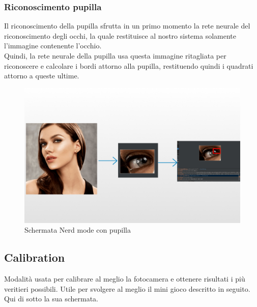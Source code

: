 \documentclass[11pt]{article}
\begin{document}
\subsubsection{Riconoscimento pupilla}
Il riconoscimento della pupilla sfrutta in un primo momento la rete neurale del riconoscimento degli occhi, la quale restituisce al nostro sistema solamente l'immagine contenente l'occhio.\\ Quindi, la rete neurale della pupilla usa questa immagine ritagliata per riconoscere e calcolare i bordi attorno alla pupilla, restituendo quindi i quadrati attorno a queste ultime.
\begin{figure}[h]
\caption{Schermata Nerd mode con pupilla }
\centering
\includegraphics[scale=0.25]{img/gazeAndroid.png}
\end{figure}

\newpage
\subsection{Calibration}
Modalità usata per calibrare al meglio la fotocamera e ottenere risultati i più veritieri possibili. Utile per svolgere al meglio il mini gioco descritto in seguito. Qui di sotto la sua schermata.
\end{document}
